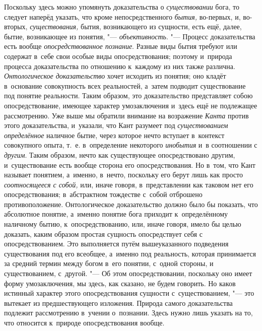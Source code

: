 Поскольку здесь можно упомянуть доказательства о
{\em существовании} бога, то следует наперёд указать,
что кроме непосредственного {\em бытия,} во-первых, и,
во-вторых, {\em существования,} бытия, возникающего из
сущности, есть ещё, далее, бытие, возникающее из понятия, "---
{\em объективность}. "--- Процесс доказательства есть
вообще {\em опосредствованное познание}. Разные виды
бытия требуют или содержат в~себе свои особые виды опосредствования;
поэтому и~природа процесса доказательства по отношению к~каждому из них
также различна. {\em Онтологическое доказательство}
хочет исходить из понятия; оно кладёт в~основание совокупность всех
реальностей, а~затем подводит существование под понятие реальности. Таким
образом, это доказательство представляет собою опосредствование, имеющее
характер умозаключения и~здесь ещё не подлежащее рассмотрению. Уже
выше
мы обратили внимание на возражение {\em Канта} против
этого доказательства, и~указали, что Кант разумеет под
{\em существованием определённое} наличное бытие, через
которое нечто вступает в~контекст совокупного опыта, т.~е. в~определение
некоторого {\em инобытия} и~в соотношении с
{\em другим}. Таким образом, нечто как существующее
опосредствовано другим, и~существование есть вообще сторона его
опосредствования. Но в~том, что Кант называет понятием, а~именно, в~нечто,
поскольку его берут лишь как просто {\em соотносящееся
с собой,} или, иначе говоря, в~представлении как таковом нет его
опосредствования; в~абстрактном тождестве с~собой отброшено
противоположение. Онтологическое доказательство должно было бы показать,
что абсолютное понятие, а~именно понятие бога приходит к~определённому
наличному бытию, к~опосредствованию, или, иначе говоря, имело бы целью
доказать, каким образом простая сущность опосредствует себя с
опосредствованием. Это выполняется путём вышеуказанного подведения
существования под его всеобщее, а~именно под реальность, которая
принимается за средний термин между богом в~его понятии, с~одной стороны, и
существованием, с~другой. "--- Об этом опосредствовании, поскольку оно имеет
форму умозаключения, мы здесь, как сказано, не будем говорить. Но каков
истинный характер этого опосредствования сущности с~существованием, "--- это
вытекает из предшествующего изложения. Природа самого доказательства
подлежит рассмотрению в~учении о~познании. Здесь нужно лишь указать на то,
что относится к~природе опосредствования вообще.

